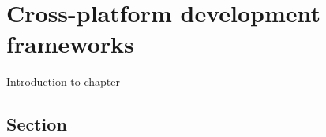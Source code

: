 \chapter{Cross-platform development frameworks}
\label{chap:frameworks}
Introduction to chapter

\section{Section}
\label{sec:third-section}

\newpage